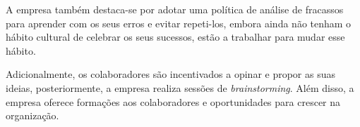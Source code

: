 A empresa também destaca-se por adotar uma política de análise de fracassos para aprender com os seus erros e evitar repeti-los, embora ainda não tenham o hábito cultural de celebrar os seus sucessos, estão a trabalhar para mudar esse hábito.

Adicionalmente, os colaboradores são incentivados a opinar e propor as suas ideias, posteriormente, a empresa realiza sessões de \textit{brainstorming}. Além disso, a empresa oferece formações aos colaboradores e oportunidades para crescer na organização.

